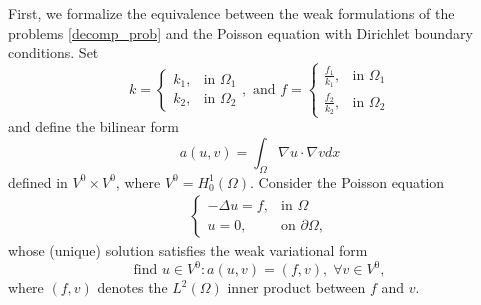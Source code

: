 \documentclass[5p,authoryear]{elsarticle}
\begin{document}
First, we formalize the equivalence between the weak formulations of the problems \eqref{decomp_prob} and the Poisson equation with Dirichlet boundary conditions. Set
\[
k = \begin{cases}
    k_1,& \text{in } \Omega_1\\
    k_2,& \text{in } \Omega_2
\end{cases}, \text{ and }
f = \begin{cases}
    \frac{f_1}{k_1},& \text{in } \Omega_1\\
    \frac{f_2}{k_2},& \text{in } \Omega_2
\end{cases}
\]
and define the bilinear form
\[
    a(u,v)=\int_\Omega \nabla u \cdot \nabla v dx
\]
defined in \(V^0 \times V^0\), where \(V^0 = H^1_0(\Omega)\). Consider the Poisson equation
\begin{align}\label{decomp_poisson}
    \begin{cases}
        -\Delta u = f, & \text{in }\Omega \\
        u = 0, & \text{on } \partial\Omega,
    \end{cases}
\end{align}
whose (unique) solution satisfies the weak variational form
\begin{equation}\label{weak_poisson}
    \text{find } u \in V^0: a(u,v) = (f, v), \; \forall v \in V^0,
\end{equation}
where \((f,v)\) denotes the \(L^2(\Omega)\) inner product between \(f\) and \(v\).
\end{document}
